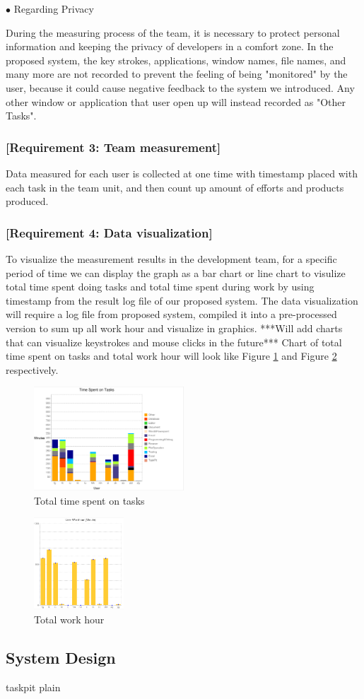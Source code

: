 \documentclass [paper]{ieice}
\begin{document}
\noindent $\bullet$ Regarding Privacy \par
		During the measuring process of the team, it is necessary to protect personal information and keeping the privacy of developers in a comfort zone. In the proposed system, the key strokes, applications, window names, file names, and many more are not recorded to prevent the feeling of being "monitored" by the user, because it could cause negative feedback to the system we introduced. Any other window or application that user open up will instead recorded as "Other Tasks".
		
\subsubsection{[Requirement 3: Team measurement]}
	Data measured for each user is collected at one time with timestamp placed with each task in the team unit, and then count up amount of efforts and products produced.
	
\subsubsection{[Requirement 4: Data visualization]}
	To visualize the measurement results in the development team, for a specific period of time we can display the graph as a bar chart or line chart to visulize total time spent doing tasks and total time spent during work by using timestamp from the result log file of our proposed system. The data visualization will require a log file from proposed system, compiled it into a pre-processed version to sum up all work hour and visualize in graphics. ***Will add charts that can visualize keystrokes and mouse clicks in the future*** Chart of total time spent on tasks and total work hour will look like Figure \ref{fig1} and Figure \ref{fig2} respectively.
	
\begin{figure}[h]
	\centering	
\includegraphics[width=0.5\textwidth]{fig1}
	\caption{Total time spent on tasks}
	\label{fig1}
\end{figure}

\begin{figure}[h]
	\centering	
\includegraphics[width=0.3\textwidth]{fig2}
	\caption{Total work hour}
	\label{fig2}
\end{figure}
	
\subsection{System Design}
	
	
 {taskpit}
 {plain}
	
\end{document}
